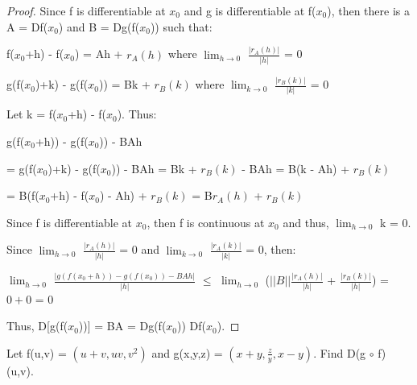     \begin{proof}
        Since f is differentiable at $x_0$ and g is differentiable at f($x_0$),
        then there is a A = Df($x_0$) and B = Dg(f($x_0$)) such that:

        \hspace{0.5cm}
        f($x_0$+h) - f($x_0$)
        = Ah + $r_A(h)$
        \hspace{2cm}
        where $\lim_{h \rightarrow 0}$ $\frac{|r_A(h)|}{|h|}$ = 0

        \hspace{0.5cm}
        g(f($x_0$)+k) - g(f($x_0$))
        = Bk + $r_B(k)$
        \hspace{1cm}
        where $\lim_{k \rightarrow 0}$ $\frac{|r_B(k)|}{|k|}$ = 0

        Let k = f($x_0$+h) - f($x_0$). Thus:

        \hspace{0.5cm}
        g(f($x_0$+h)) - g(f($x_0$)) - BAh

        \hspace{0.5cm}
        = g(f($x_0$)+k) - g(f($x_0$)) - BAh
        = Bk + $r_B(k)$ - BAh
        = B(k - Ah) + $r_B(k)$

        \hspace{0.5cm}
        = B(f($x_0$+h) - f($x_0$) - Ah) + $r_B(k)$
        = B$r_A(h)$ + $r_B(k)$

        Since f is differentiable at $x_0$, then f is continuous at $x_0$
        and thus, $\lim_{h \rightarrow 0}$ k = 0.

        Since $\lim_{h \rightarrow 0}$ $\frac{|r_A(h)|}{|h|}$ = 0
        and $\lim_{k \rightarrow 0}$ $\frac{|r_A(k)|}{|k|}$ = 0, then:

        \hspace{0.5cm}
        $\lim_{h \rightarrow 0}$ $\frac{| g(f(x_0+h)) - g(f(x_0)) - BAh|}{|h|}$
        $\leq$ $\lim_{h \rightarrow 0}$ ($||B|| \frac{|r_A(h)|}{|h|}$
                + $\frac{|r_B(k)|}{|h|}$)
        = $0+0$ = 0

        Thus, D[g(f($x_0$))] = BA = Dg(f($x_0$)) Df($x_0$).
    \end{proof}

    \newpage



    \begin{example}
        Let f(u,v) = $(u+v,uv,v^2)$
        and g(x,y,z) = $(x+y,\frac{z}{y},x-y)$.
        Find D(g $\circ$ f)(u,v).
    \end{example}

